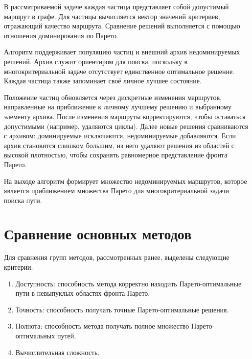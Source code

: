 В рассматриваемой задаче каждая частица представляет собой допустимый маршрут в графе. Для частицы вычисляется вектор значений критериев, отражающий качество маршрута. Сравнение решений выполняется с помощью отношения доминирования по Парето.

Алгоритм поддерживает популяцию частиц и внешний архив недоминируемых решений. Архив служит ориентиром для поиска, поскольку в многокритериальной задаче отсутствует единственное оптимальное решение. Каждая частица также запоминает своё личное лучшее состояние.

Положение частиц обновляется через дискретные изменения маршрутов, направленные на приближение к личному лучшему решению и выбранному элементу архива. После изменения маршруты корректируются, чтобы оставаться допустимыми (например, удаляются циклы). Далее новые решения сравниваются с архивом: доминируемые исключаются, недоминируемые добавляются. Если архив становится слишком большим, из него удаляют решения из областей с высокой плотностью, чтобы сохранять равномерное представление фронта Парето.

На выходе алгоритм формирует множество недоминируемых маршрутов, которое является приближением множества Парето для многокритериальной задачи поиска пути.

\section{Сравнение основных методов}

Для сравнения групп методов, рассмотренных ранее, выделены следующие критерии:

\begin{enumerate}
    \item Доступность: способность метода корректно находить Парето-оптимальные пути в невыпуклых областях фронта Парето.
    \item Точность: способность получать точные Парето-оптимальные решения.
    \item Полнота: способность метода получать полное множество Парето-оптимальных путей.
    \item Вычислительная сложность.
\end{enumerate}

